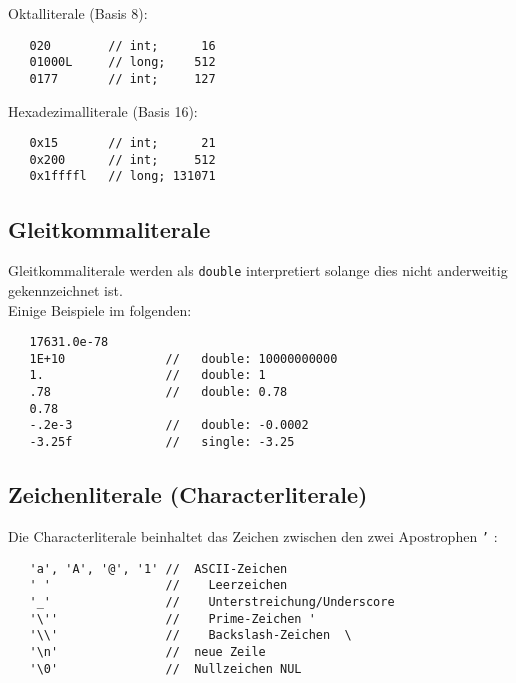 Oktalliterale (Basis 8): \hfill
\begin{minipage}[t] {0.5\textwidth}
\begin{verbatim}
   020        // int;      16
   01000L     // long;    512
   0177       // int;     127
\end{verbatim}
\end{minipage}

Hexadezimalliterale (Basis 16): \hfill
\begin{minipage}[t] {0.5\textwidth}
\begin{verbatim}
   0x15       // int;      21
   0x200      // int;     512
   0x1ffffl   // long; 131071
\end{verbatim}
\end{minipage}
%
%
\subsection{Gleitkommaliterale}
\label{p:2.22.2}
%
Gleitkommaliterale werden als \texttt{double} interpretiert solange
dies nicht anderweitig gekennzeichnet ist.
\\
Einige Beispiele im folgenden:
\begin{minipage}[t] {0.6\textwidth}
\begin{verbatim}
   17631.0e-78
   1E+10              //   double: 10000000000
   1.                 //   double: 1
   .78                //   double: 0.78
   0.78
   -.2e-3             //   double: -0.0002
   -3.25f             //   single: -3.25
\end{verbatim}
\end{minipage}
%
%
\subsection{Zeichenliterale (Characterliterale)}
\label{p:2.22.3}
%
Die Characterliterale beinhaltet das Zeichen zwischen den zwei Apostrophen
\texttt{'} :
\begin{minipage}[t] {0.9\textwidth}
\begin{verbatim}
   'a', 'A', '@', '1' //  ASCII-Zeichen
   ' '                //    Leerzeichen
   '_'                //    Unterstreichung/Underscore
   '\''               //    Prime-Zeichen '
   '\\'               //    Backslash-Zeichen  \
   '\n'               //  neue Zeile
   '\0'               //  Nullzeichen NUL
\end{verbatim}
\end{minipage}
%
%
